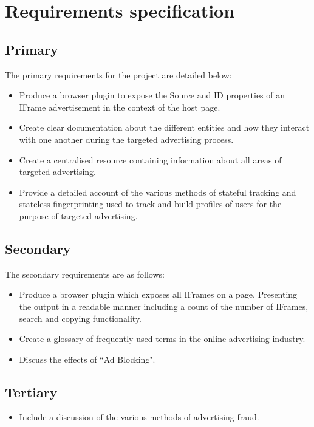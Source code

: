 \documentclass[12pt]{article}
\begin{document}
\pagebreak

\section{Requirements specification} \label{requirements}

\subsection{Primary}
The primary requirements for the project are detailed below:
\begin{itemize}
    \item Produce a browser plugin to expose the Source and ID properties of an IFrame advertisement in the context of the host page.
    \item Create clear documentation about the different entities and how they interact with one another during the targeted advertising process.
    \item Create a centralised resource containing information about all areas of targeted advertising.
    \item Provide a detailed account of the various methods of stateful tracking and stateless fingerprinting used to track and build profiles of users for the purpose of targeted advertising.
\end{itemize}

\subsection{Secondary}
The secondary requirements are as follows:
\begin{itemize}
    \item Produce a browser plugin which exposes all IFrames on a page. Presenting the output in a readable manner including a count of the number of IFrames, search and copying functionality. 
    \item Create a glossary of frequently used terms in the online advertising industry.
    \item Discuss the effects of ``Ad Blocking". 
\end{itemize}

\subsection{Tertiary}
\begin{itemize}
    \item Include a discussion of the various methods of advertising fraud.
\end{itemize}
\end{document}
